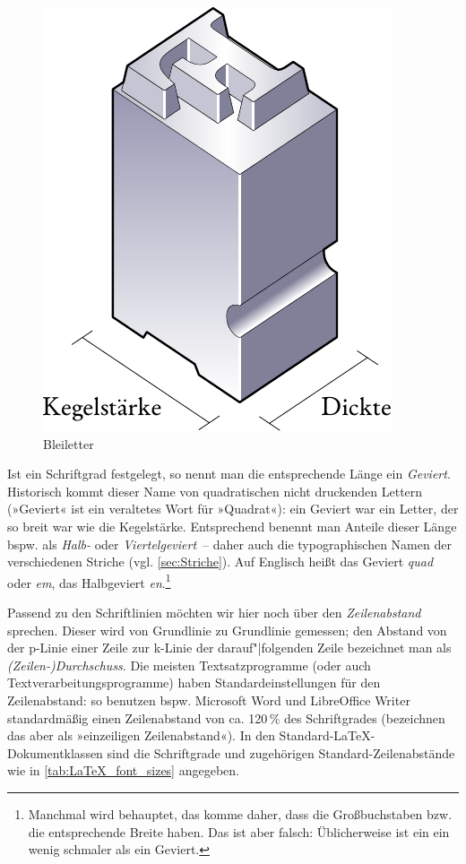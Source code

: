 \begin{figure}
  \centering
  \includegraphics[width=.5\textwidth]{Bleiletter}
  \caption{Bleiletter}
  \label{fig:Bleiletter}
\end{figure}

Ist ein Schriftgrad festgelegt, so nennt man die entsprechende Länge
ein \emph{Geviert}.  Historisch kommt dieser Name von quadratischen
nicht druckenden Lettern (»Geviert« ist ein veraltetes Wort für
»Quadrat«): ein Geviert war ein Letter, der so breit war wie die
Kegelstärke.  Entsprechend benennt man Anteile dieser Länge bspw. als
\emph{Halb-} oder \emph{Viertelgeviert}~-- daher auch die
typographischen Namen der verschiedenen Striche
(vgl. \cref{sec:Striche}).  Auf Englisch heißt das Geviert
\emph{\foreignlanguage{british}{quad}} oder
\emph{\foreignlanguage{british}{em}}, das Halbgeviert
\emph{\foreignlanguage{british}{en}}.\footnote{Manchmal wird
  behauptet, das komme daher, dass die Großbuchstaben 
  bzw.  die entsprechende Breite haben.  Das ist aber falsch:
  Üblicherweise ist ein  ein wenig schmaler als ein Geviert.}

Passend zu den Schriftlinien möchten wir hier noch über den
\emph{Zeilenabstand} sprechen.  Dieser wird von Grundlinie zu
Grundlinie gemessen; den Abstand von der p-Linie einer Zeile zur
k-Linie der darauf"|folgenden Zeile bezeichnet man als
\emph{(Zeilen-)Durchschuss}.  Die meisten Textsatzprogramme (oder auch
Textverarbeitungsprogramme) haben Standardeinstellungen für den
Zeilenabstand: so benutzen bspw. Microsoft Word und LibreOffice Writer
standardmäßig einen Zeilenabstand von ca. 120\,\% des Schriftgrades
(bezeichnen das aber als »einzeiligen Zeilenabstand«).  In den
Standard-\LaTeX-Dokumentklassen sind die Schriftgrade und zugehörigen
Standard-Zeilenabstände wie in \cref{tab:LaTeX_font_sizes} angegeben.

